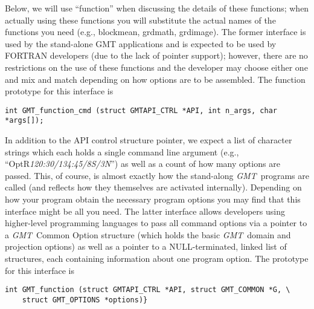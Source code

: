 \documentclass{report}
\newcommand{\GMT}{\textit{GMT}}%
\newcommand{\GMT}{\htmladdnormallink{\texttt{[image: eps/GMT\_glyph10.eps]}}{http://gmt.soest.hawaii.edu}}%
\newcommand{\GMT}{\htmladdnormallink{\textbf{GMT}}{http://gmt.soest.hawaii.edu}}%
\begin{document}
Below, we will use ``function'' when discussing the details of these functions; when actually using
these functions you will substitute the actual names of the functions you need (e.g., blockmean,
grdmath, grdimage).
The former interface is used by the stand-alone GMT applications and is expected to be used by
FORTRAN developers (due to the lack of pointer support); however, there are no restrictions on
the use of these functions and the developer may choose either one and mix and match depending
on how options are to be assembled.  The function prototype for this interface is

\begin{verbatim}
int GMT_function_cmd (struct GMTAPI_CTRL *API, int n_args, char *args[]);
\end{verbatim}

In addition to the API control structure pointer, we expect a list of character strings which each
holds a single command line argument (e.g., ``Opt{R}{\it 120:30/134:45/8S/3N}'') as well as a count
of how many options are passed.  This, of course, is almost exactly how the stand-along \GMT\
programs are called (and reflects how they themselves are activated internally).  Depending on how
your program obtain the necessary program options you may find that this interface might be all
you need.
The latter interface allows developers using higher-level programming languages to pass all command
options via a pointer to a \GMT\ Common Option structure (which holds the basic \GMT\ domain and projection 
options) as well as a pointer to a NULL-terminated, linked list of structures, each containing
information about one program option.
The prototype for this interface is

\begin{verbatim}
int GMT_function (struct GMTAPI_CTRL *API, struct GMT_COMMON *G, \
    struct GMT_OPTIONS *options)}
\end{verbatim}
\end{document}
